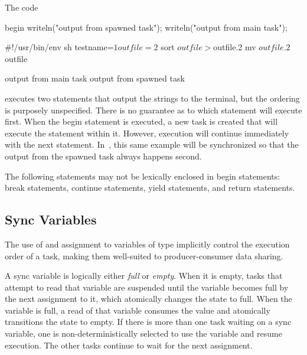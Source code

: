 \begin{example}
The code
\begin{chapelpre}
\end{chapelpre}
\begin{chapel}
begin writeln("output from spawned task");
writeln("output from main task");
\end{chapel}
\begin{chapelprediff}
\#!/usr/bin/env sh
testname=$1
outfile=$2
sort $outfile > $outfile.2
mv $outfile.2 $outfile
\end{chapelprediff}
\begin{chapeloutput}
output from main task
output from spawned task
\end{chapeloutput}
executes two  statements that output the strings to the
terminal, but the ordering is purposely unspecified.  There is no
guarantee as to which statement will execute first.  When the
begin statement is executed, a new task is created that will execute
the  statement within it.  However, execution will
continue immediately with the next statement.
In~, this same example will be synchronized so
that the output from the spawned task always happens second.
\end{example}

The following statements may not be lexically enclosed in
begin statements: break statements, continue statements,
yield statements, and return statements.

\subsection{Sync Variables}
\label{Sync_Variables}

The use of and assignment to variables of  type implicitly
control the execution order of a task, making them well-suited to
producer-consumer data sharing.

A sync variable is logically either {\em full} or {\em empty}.  When
it is empty, tasks that attempt to read that variable are suspended
until the variable becomes full by the next assignment to it, which
atomically changes the state to full.  When the variable is full, a
read of that variable consumes the value and atomically transitions
the state to empty.  If there is more than one task waiting on a sync
variable, one is non-deterministically selected to use the variable
and resume execution.  The other tasks continue to wait for the next
assignment.

